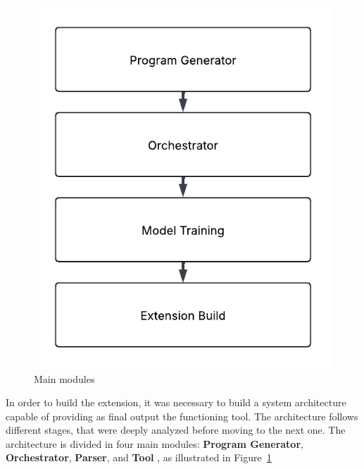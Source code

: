 \begin{figure}[htbp]
  \centering
  \includegraphics[scale=0.7]{figures/main_modules.pdf}
  \caption{Main modules}
  \label{fig:main_modules}
\end{figure}




In order to build the extension, it was necessary to build a system architecture capable of providing as final output the functioning tool. The architecture follows different stages, that were deeply analyzed before moving to the next one.
The architecture is divided in four main modules: \textbf{Program Generator}, \textbf{Orchestrator}, \textbf{Parser}, and \textbf{Tool }, as illustrated in Figure~\ref{fig:main_modules} 











